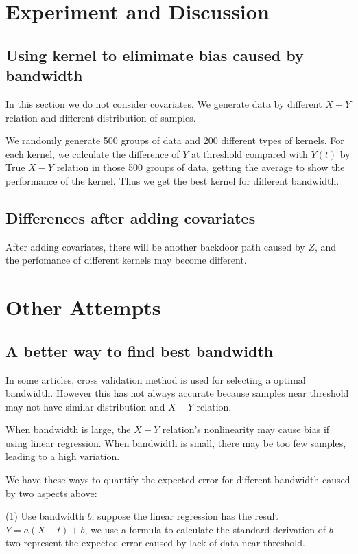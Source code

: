 \documentclass[a4 paper,12pt]{article}
\begin{document}
\section{Experiment and Discussion}

\subsection{Using kernel to elimimate bias caused by bandwidth}

In this section we do not consider covariates. We generate data by different $X-Y$ relation and different distribution of samples. 

We randomly generate 500 groups of data and 200 different types of kernels. For each kernel, we calculate the difference of $Y$ at threshold compared with $Y(t)$ by True $X-Y$ relation in those 500 groups of data, getting the average to show the performance of the kernel. Thus we get the best kernel for different bandwidth.

\subsection{ Differences after adding covariates}
After adding covariates, there will be another backdoor path caused by $Z$, and the perfomance of different kernels may become different.


\section{Other Attempts}
\subsection*{A better way to find best bandwidth}

In some articles, cross validation method is used for selecting a optimal bandwidth. However this has not always accurate because samples near threshold may not have similar distribution and $X-Y$ relation.

When bandwidth is large, the $X-Y$ relation's nonlinearity may cause bias if using linear regression. When bandwidth is small, there may be too few samples, leading to a high variation.

We have these ways to quantify the expected error for different bandwidth caused by two aspects above:

(1) Use bandwidth $b$, suppose the linear regression has the result $Y=a(X-t)+b$, we use a formula to calculate the standard derivation of $b$ two represent the expected error caused by lack of data near threshold.
\end{document}
